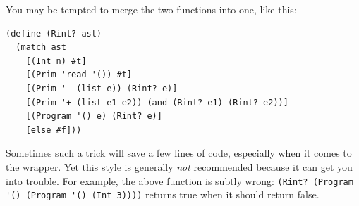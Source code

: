 \documentclass[11pt]{book}
\begin{document}
You may be tempted to merge the two functions into one, like this:
\begin{center}
\begin{minipage}{0.5\textwidth}
\begin{lstlisting}
(define (Rint? ast)
  (match ast
    [(Int n) #t]
    [(Prim 'read '()) #t]
    [(Prim '- (list e)) (Rint? e)]
    [(Prim '+ (list e1 e2)) (and (Rint? e1) (Rint? e2))]
    [(Program '() e) (Rint? e)]
    [else #f]))
\end{lstlisting}
\end{minipage}
\end{center}
%
Sometimes such a trick will save a few lines of code, especially when
it comes to the  wrapper.  Yet this style is generally
\emph{not} recommended because it can get you into trouble.
%
For example, the above function is subtly wrong:
\lstinline{(Rint? (Program '() (Program '() (Int 3))))}
returns true when it should return false.
\end{document}
